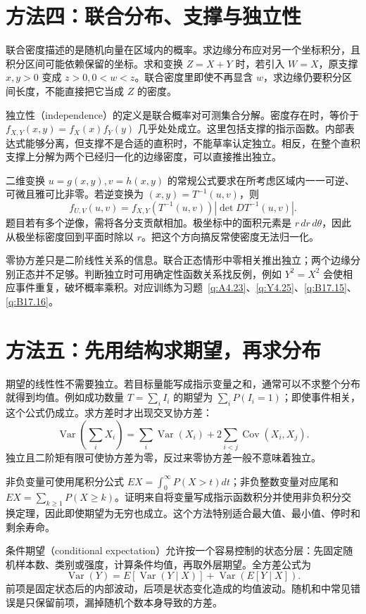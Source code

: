 \documentclass[UTF8,12pt,a4paper,fontset=fandol]{ctexbook}
\begin{document}
\section*{方法四：联合分布、支撑与独立性}
联合密度描述的是随机向量在区域内的概率。求边缘分布应对另一个坐标积分，且积分区间可能依赖保留的坐标。求和变换 $Z=X+Y$ 时，若引入 $W=X$，原支撑 $x,y>0$ 变成 $z>0,0<w<z$。联合密度里即使不再显含 $w$，求边缘仍要积分区间长度，不能直接把它当成 $Z$ 的密度。

独立性（independence）的定义是联合概率对可测集合分解。密度存在时，等价于 $f_{X,Y}(x,y)=f_X(x)f_Y(y)$ 几乎处处成立。这里包括支撑的指示函数。内部表达式能够分离，但支撑不是合适的直积时，不能草率认定独立。相反，在整个直积支撑上分解为两个已经归一化的边缘密度，可以直接推出独立。

二维变换 $u=g(x,y),v=h(x,y)$ 的常规公式要求在所考虑区域内一一可逆、可微且雅可比非零。若逆变换为 $(x,y)=T^{-1}(u,v)$，则
\[
f_{U,V}(u,v)=f_{X,Y}(T^{-1}(u,v))\left|\det D T^{-1}(u,v)\right|.
\]
题目若有多个逆像，需将各分支贡献相加。极坐标中的面积元素是 $r\,dr\,d\theta$，因此从极坐标密度回到平面时除以 $r$。把这个方向搞反常使密度无法归一化。

零协方差只是二阶线性关系的信息。联合正态情形中零相关推出独立；两个边缘分别正态并不足够。判断独立时可用确定性函数关系找反例，例如 $Y^2=X^2$ 会使相应事件重复，破坏概率乘积。对应训练为习题~\ref{q:A4.23}、\ref{q:Y4.25}、\ref{q:B17.15}、\ref{q:B17.16}。

\section*{方法五：先用结构求期望，再求分布}
期望的线性性不需要独立。若目标量能写成指示变量之和，通常可以不求整个分布就得到均值。例如成功数量 $T=\sum_iI_i$ 的期望为 $\sum_iP(I_i=1)$；即使事件相关，这个公式仍成立。求方差时才出现交叉协方差：
\[
\operatorname{Var}\left(\sum_iX_i\right)=\sum_i\operatorname{Var}(X_i)+2\sum_{i<j}\operatorname{Cov}(X_i,X_j).
\]
独立且二阶矩有限可使协方差为零，反过来零协方差一般不意味着独立。

非负变量可使用尾积分公式 $EX=\int_0^\infty P(X>t)dt$；非负整数变量对应尾和 $EX=\sum_{k\ge1}P(X\ge k)$。证明来自将变量写成指示函数积分并使用非负积分交换定理，因此即使期望为无穷也成立。这个方法特别适合最大值、最小值、停时和剩余寿命。

条件期望（conditional expectation）允许按一个容易控制的状态分层：先固定随机样本数、类别或强度，计算条件均值，再取外层期望。全方差公式为
\[
\operatorname{Var}(Y)=E[\operatorname{Var}(Y\mid X)]+\operatorname{Var}(E[Y\mid X]).
\]
前项是固定状态后的内部波动，后项是状态变化造成的均值波动。随机和中常见错误是只保留前项，漏掉随机个数本身导致的方差。
\end{document}
